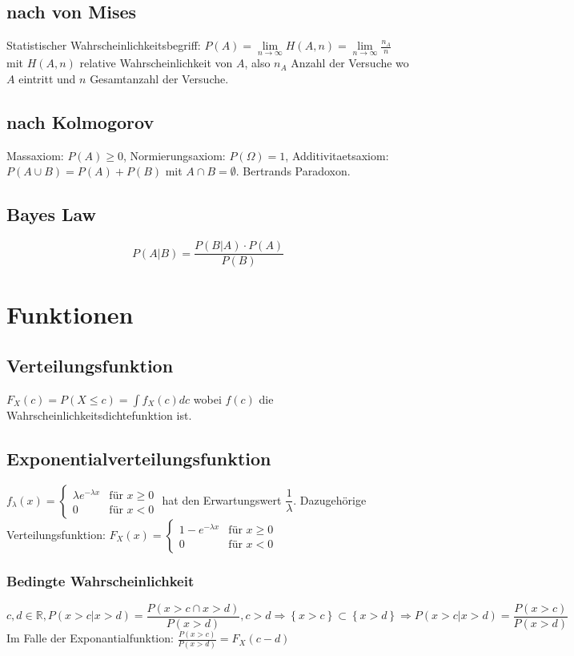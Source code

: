 \documentclass[10pt,a4paper]{article}
\begin{document}
\subsection{nach von Mises}
Statistischer Wahrscheinlichkeitsbegriff: $P(A)=\lim\limits_{n \rightarrow \infty} H(A,n)=\lim\limits_{n \rightarrow \infty} \frac{n_A}{n}$ mit $H(A,n)$ relative Wahrscheinlichkeit von $A$, also $n_A$ Anzahl der Versuche wo $A$ eintritt und $n$ Gesamtanzahl der Versuche.
\subsection{nach Kolmogorov}
Massaxiom: $P(A) \geq 0$, Normierungsaxiom: $P(\Omega)=1$, Additivitaetsaxiom: $P(A \cup B) = P(A) + P(B)$ mit $A \cap B = \emptyset$. Bertrands Paradoxon.

\subsection{Bayes Law}
\[P(A|B)= \frac{P(B|A) \cdot P(A)}{P(B)}\]

\section{Funktionen}
\subsection{Verteilungsfunktion}
$F_X(c) = P(X \leq c) = \int f_X(c) dc$ wobei $f(c)$ die Wahrscheinlichkeitsdichtefunktion ist.

\subsection{Exponentialverteilungsfunktion}
$f_\lambda(x) =
\begin{cases}
\lambda e^{-\lambda x} & \mbox{für } x \geq 0 \\
0 & \mbox{für } x < 0
\end{cases}
$ hat den Erwartungswert $\dfrac{1}{\lambda}$. Dazugehörige Verteilungsfunktion: $F_X(x) = \begin{cases}
1-e^{-\lambda x} & \mbox{für } x \geq 0 \\
0 & \mbox{für } x < 0
\end{cases}$

\subsubsection{Bedingte Wahrscheinlichkeit}
\[c, d \in \mathbb{R},
P(x > c | x > d) = \dfrac{P(x>c \cap x > d)}{P(x > d)}, c>d \Rightarrow \left\{ x > c \right\} \subset
\left\{ x > d \right\} \Rightarrow P(x > c | x > d) = \dfrac{P(x>c)}{P(x > d)}\]
Im Falle der Exponantialfunktion: $\frac{P(x>c)}{P(x > d)} = F_X(c-d)$
\end{document}
